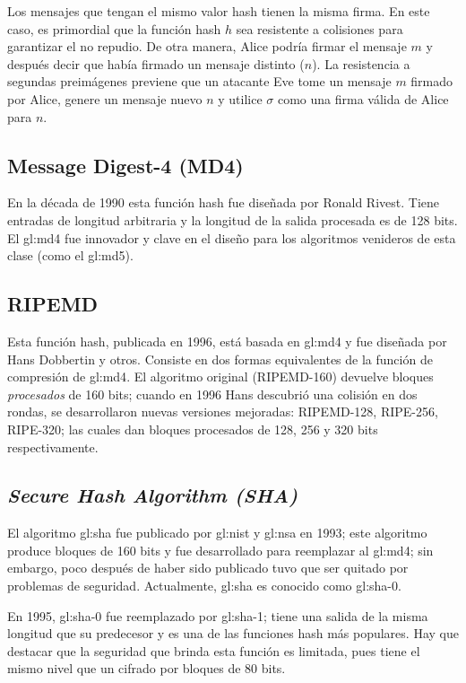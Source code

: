 Los mensajes que tengan el mismo valor hash tienen la misma firma. En
este caso, es primordial que la función hash $h$ sea resistente a
colisiones para garantizar el no repudio. De otra manera, Alice podría
firmar el mensaje $m$ y después decir que había firmado un mensaje
distinto ($n$).
La resistencia a segundas preimágenes previene que un atacante Eve tome
un mensaje $m$ firmado por Alice, genere un mensaje nuevo $n$ y utilice
$\sigma$ como una firma válida de Alice para $n$.

\subsection{Message Digest-4 (MD4)}
En la década de 1990 esta función hash fue diseñada por Ronald Rivest.
Tiene entradas de longitud arbitraria y la longitud de la salida
procesada es de 128 bits. El \gls{gl:md4} fue innovador y
clave en el diseño para los algoritmos venideros de esta clase (como
el \gls{gl:md5}).

\subsection{RIPEMD}
Esta función hash, publicada en 1996, está basada en \gls{gl:md4} y fue
diseñada por Hans Dobbertin y otros. Consiste en dos formas equivalentes de la
función de compresión de \gls{gl:md4}. El algoritmo original (RIPEMD-160)
devuelve bloques \textit{procesados} de 160 bits; cuando en 1996 Hans
descubrió una colisión en dos rondas, se desarrollaron nuevas versiones
mejoradas: RIPEMD-128, RIPE-256, RIPE-320; las cuales dan bloques procesados de
128, 256 y 320 bits respectivamente.

\subsection{\textit{Secure Hash Algorithm (SHA)}}
El algoritmo \gls{gl:sha} fue publicado por \gls{gl:nist} y
\gls{gl:nsa} en 1993; este algoritmo produce bloques de 160 bits y
fue desarrollado para reemplazar al \gls{gl:md4}; sin embargo, poco
después de haber sido publicado tuvo que ser quitado por problemas de
seguridad. Actualmente, \gls{gl:sha} es conocido como \gls{gl:sha}-0.

En 1995, \gls{gl:sha}-0 fue reemplazado por \gls{gl:sha}-1; tiene
una salida de la misma longitud que su predecesor y es una de las funciones
hash más populares. Hay que destacar que la seguridad que brinda esta función
es limitada, pues tiene el mismo nivel que un cifrado por bloques de 80 bits.

